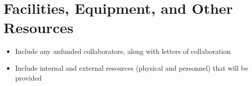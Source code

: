 \documentclass[10pt]{NSF}
\begin{document}
\section{Facilities, Equipment, and Other Resources}

\begin{itemize}
\item{Include any unfunded collaborators, along with letters of
  collaboration}
\item{Include internal and external resources (physical and personnel)
  that will be provided}
\end{itemize}
\end{document}
